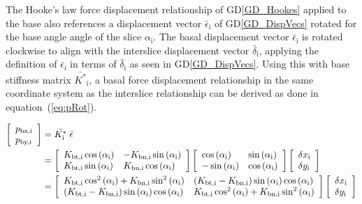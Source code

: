 \documentclass[12pt]{article}
\newcommand{\dref}[1]{GD\ref{#1}}
\begin{document}
\noindent
The Hooke's law force displacement relationship of \dref{GD_Hookes}
applied to the base also references a displacement vector
$\bar{\epsilon}_\text{i}$ of \dref{GD_DispVecs} rotated for the base
angle angle of the slice $\alpha_\text{i}$. The basal displacement
vector $\bar{\epsilon}_\text{i}$ is rotated clockwise to align with
the interslice displacement vector $\bar{\delta}_\text{i}$, applying
the definition of $\bar{\epsilon}_\text{i}$ in terms of
$\bar{\delta}_\text{i}$ as seen in \dref{GD_DispVecs}. Using this with
base stiffness matrix $\bar{K^*}_\text{i}$, a basal force displacement
relationship in the same coordinate system as the interslice
relationship can be derived as done in equation~(\ref{eq:pRot}).
    
\begin{equation}\label{eq:pRot} \begin{aligned}
    \left[ \begin{array}{l} p_\text{bx,i}
        \\ p_\text{by,i} \end{array}\right]
    & = \bar{K^*_\text{i}} \; \bar{\epsilon} \\
      {} & = \left[ \begin{array}{l l} K_\text{bt,i}
      \cos\left(\alpha_\text{i}\right) & - K_\text{bn,i}
      \sin\left(\alpha_\text{i}\right)\\  K_\text{bt,i}
      \sin\left(\alpha_\text{i}\right) & K_\text{bn,i}
      \cos\left(\alpha_\text{i}\right)\end{array}\right]
      \left[ \begin{array}{l l} \cos\left(\alpha_\text{i}\right)
          &\sin\left(\alpha_\text{i}\right)\\
          -\sin\left(\alpha_\text{i}\right)
          & \cos\left(\alpha_\text{i}\right)\end{array}\right]
      \left[ \begin{array}{l} \delta x_\text{i}
          \\ \delta y_\text{i} \end{array} \right] \\
      {} & = \left[ \begin{array}{l l}
          K_\text{bt,i} \cos^2\left(\alpha_\text{i}\right)+
          K_\text{bn,i} \sin^2\left(\alpha_\text{i}\right)
          & \left(K_\text{bt,i} - K_\text{bn,i}\right)
          \sin\left(\alpha_\text{i}\right)
          \cos\left(\alpha_\text{i}\right)\\
          \left(K_\text{bt,i} - K_\text{bn,i}\right)
          \sin\left(\alpha_\text{i}\right)
          \cos\left(\alpha_\text{i}\right)
          & K_\text{bt,i} \cos^2\left(\alpha_\text{i}\right)+
          K_\text{bn,i} \sin^2\left(\alpha_\text{i}\right)
        \end{array} \right]
    \left[ \begin{array}{l} \delta x_\text{i}
        \\ \delta y_\text{i}
      \end{array} \right]\end{aligned} 
      \end{equation}
\end{document}
